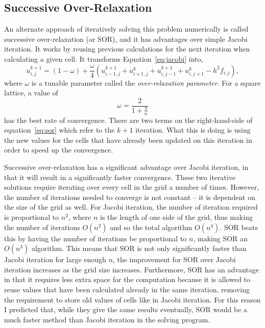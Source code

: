 \subsection{Successive Over-Relaxation}

An alternate approach of iteratively solving this problem numerically is called successive over-relaxation (or SOR), and
it has advantages over simple Jacobi iteration. It works by reusing previous calculations for the next iteration when
calculating a given cell. It transforms Equation~\ref{eq:jacobi} into,
\begin{equation} \label{eq:sor}
u_{i,j}^{k+1} = (1-\omega) + \frac{\omega}{4}\left(u_{i-1,j}^{k+1} + u_{i+1,j}^{k} + u_{i,j-1}^{k+1} + u_{i,j+1}^{k} - h^2 f_{i,j}\right),
\end{equation}
where $\omega$ is a tunable parameter called the \textit{over-relaxation parameter}. For a square lattice, a value of
$$\omega = \frac{2}{1+\frac{\pi}{n}}$$
has the best rate of convergence\cite{poisson-relax}. There are two terms on the right-hand-side of equation~\ref{eq:sor} which refer to the
$k+1$ iteration. What this is doing is using the new values for the cells that have already been updated on this iteration
in order to speed up the convergence.

Successive over-relaxation has a significant advantage over Jacobi iteration, in that it will result in a significantly faster convergence.
These two iterative solutions require iterating over every cell in the grid a number of times. However, the number of iterations needed to
converge is not constant -- it is dependent on the size of the grid as well. For Jacobi iteration, the number of iteration required is
proportional to $n^2$, where $n$ is the length of one side of the grid, thus making the number of iterations $O(n^2)$ and so the total
algorithm $O(n^4)$. SOR beats this by having the number of iterations be proportional to $n$, making SOR an $O(n^3)$ algorithm\cite{poisson-relax}. This means
that SOR is not only significantly faster than Jacobi iteration for large enough $n$, the improvement for SOR over Jacobi iteration increases
as the grid size increases. Furthermore, SOR has an advantage in that it requires less extra space for the computation because it is allowed
to reuse values that have been calculated already in the same iteration, removing the requirement to store old values of cells like in Jacobi
iteration. For this reason I predicted that, while they give the same results eventually, SOR would be a much faster method than Jacobi
iteration in the solving program.






